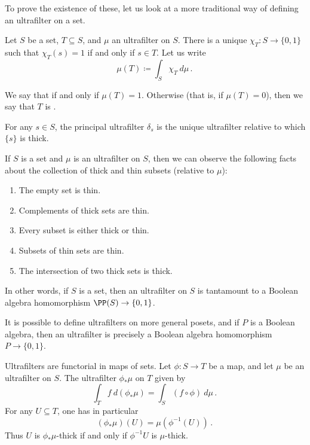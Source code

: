 To prove the existence of these, let us look at a more traditional way of defining an ultrafilter on a set.

\begin{definition}
	Let $ S $ be a set, $ T \subseteq S$, and $ \mu $ an ultrafilter on $ S $.
	There is a unique  $ \chi_T \colon S \to \{ 0,1 \}$ such that $ \chi_T(s) = 1 $ if and only if $ s \in T $.
	Let us write
	\[
		\mu(T) \coloneq \int_S \chi_T \ d \mu \period
	\]
	
	We say that  if and only if $\mu(T) = 1$.
	Otherwise (that is, if $ \mu(T) = 0 $), then we say that $ T $ is .

	For any $ s \in S$, the principal ultrafilter $ \delta_s $ is the unique ultrafilter relative to which $ \{ s \} $ is thick.
\end{definition}

\begin{scholium}
	If $ S $ is a set and $ \mu $ is an ultrafilter on $ S $, then we can observe the following facts about the collection of thick and thin subsets (relative to $ \mu $):
	\begin{enumerate}
		\item The empty set is thin.
		\item Complements of thick sets are thin.
		\item Every subset is either thick or thin.
		\item Subsets of thin sets are thin.
		\item The intersection of two thick sets is thick.
	\end{enumerate}
	In other words, if $ S $ is a set, then an ultrafilter on $ S $ is tantamount to a Boolean algebra homomorphism $ \PP(S) \to \{0,1\} $.

	It is possible to define ultrafilters on more general posets, and if $ P $ is a Boolean algebra, then an ultrafilter is precisely a Boolean algebra homomorphism $ P \to \{0, 1\} $.
\end{scholium}

\begin{scholium}
	Ultrafilters are functorial in maps of sets.
	Let $ \phi \colon S \to T $ be a map, and let $ \mu $ be an ultrafilter on $ S $.
	The ultrafilter $ \phi_{\ast}\mu $ on $ T $ given by
	\[
		\int_T f \ d (\phi_{\ast}\mu) = \int_S (f \circ \phi) \ d \mu \period
	\]
	For any $ U \subseteq T$, one has in particular
	\[
		(\phi_{\ast} \mu)(U) = \mu (\phi^{-1}(U)) \period
	\]
	Thus $ U $ is $ \phi_{\ast} \mu $-thick if and only if $ \phi^{-1} U $ is $ \mu $-thick.
\end{scholium}

